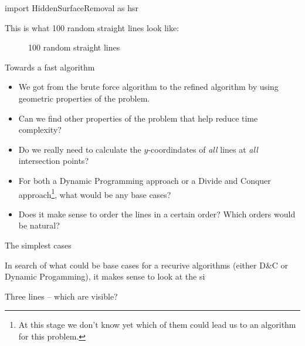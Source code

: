 \documentclass[ignorenonframetext,]{beamer}
\begin{document}
\begin{sympyblock}
  import HiddenSurfaceRemoval as hsr
\end{sympyblock}



\begin{frame}
  This is what 100 random straight lines look like:
  \begin{figure}
    \caption{100 random straight lines}
    \centering
  \end{figure}

  
\end{frame}



\begin{frame}{Towards a fast algorithm}

\begin{itemize}[<+->]
    \item We got from the brute force algorithm to the refined
      algorithm by using geometric properties of the problem. 
    \item Can we find other properties of the problem that help reduce
      time complexity? 
    \item Do we really need to calculate the $y$-coordindates of
      \emph{all} lines at \emph{all} intersection points? 
    \item For both a Dynamic Programming approach or a Divide and
      Conquer approach\footnote{At this stage we don't know yet which
        of them could lead us to an algorithm for this problem.}, 
      what would be any base cases?
    \item Does it make sense to order the lines in a certain order?
      Which orders would be natural? 
\end{itemize}
\end{frame}

\begin{frame}{The simplest cases}

In search of what could be base cases for a recurive algorithms
(either D\&C or Dynamic Progamming), it makes sense to look at the si

  
\end{frame}



\begin{frame}[fragile]{Three lines -- which are visible?}

    
\end{frame}
\end{document}
